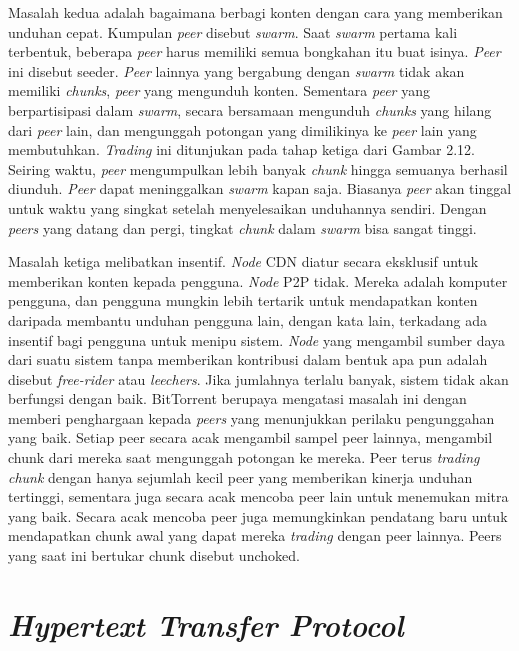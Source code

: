 Masalah kedua adalah bagaimana berbagi konten dengan cara yang memberikan unduhan cepat. Kumpulan \emph{peer} disebut \emph{swarm}. Saat \emph{swarm} pertama kali terbentuk, beberapa \emph{peer} harus memiliki semua bongkahan itu buat isinya. \emph{Peer} ini disebut seeder. \emph{Peer} lainnya yang bergabung dengan \emph{swarm} tidak akan memiliki \emph{chunks},  \emph{peer} yang mengunduh konten. Sementara \emph{peer} yang berpartisipasi dalam \emph{swarm}, secara bersamaan mengunduh \emph{chunks} yang hilang dari \emph{peer} lain, dan mengunggah potongan yang dimilikinya ke \emph{peer} lain yang membutuhkan. \emph{Trading} ini ditunjukan pada tahap ketiga dari Gambar 2.12. Seiring waktu, \emph{peer} mengumpulkan lebih banyak \emph{chunk} hingga semuanya berhasil diunduh. \emph{Peer} dapat meninggalkan \emph{swarm} kapan saja. Biasanya \emph{peer} akan tinggal untuk waktu yang singkat setelah menyelesaikan unduhannya sendiri. Dengan \emph{peers} yang datang dan pergi, tingkat \emph{chunk} dalam \emph{swarm} bisa sangat tinggi.

Masalah ketiga melibatkan insentif. \emph{Node} CDN diatur secara eksklusif untuk memberikan konten kepada pengguna. \emph{Node} P2P tidak. Mereka adalah komputer pengguna, dan pengguna mungkin lebih tertarik untuk mendapatkan konten daripada membantu unduhan pengguna lain, dengan kata lain, terkadang ada insentif bagi pengguna untuk menipu sistem. \emph{Node} yang mengambil sumber daya dari suatu sistem tanpa memberikan kontribusi dalam bentuk apa pun adalah disebut \emph{free-rider} atau \emph{leechers}. Jika jumlahnya terlalu banyak, sistem tidak akan berfungsi dengan baik. BitTorrent berupaya mengatasi masalah ini dengan memberi penghargaan kepada \emph{peers} yang menunjukkan perilaku pengunggahan yang baik. Setiap {peer} secara acak mengambil sampel {peer} lainnya, mengambil chunk dari mereka saat mengunggah potongan ke mereka. {Peer} terus \emph{trading chunk} dengan hanya sejumlah kecil {peer} yang memberikan kinerja unduhan tertinggi, sementara juga secara acak mencoba {peer} lain untuk menemukan mitra yang baik. Secara acak mencoba {peer} juga memungkinkan pendatang baru untuk mendapatkan chunk awal yang dapat mereka \emph{trading} dengan {peer} lainnya. {Peers} yang saat ini bertukar chunk disebut unchoked.

\section{\emph{Hypertext Transfer Protocol}}

